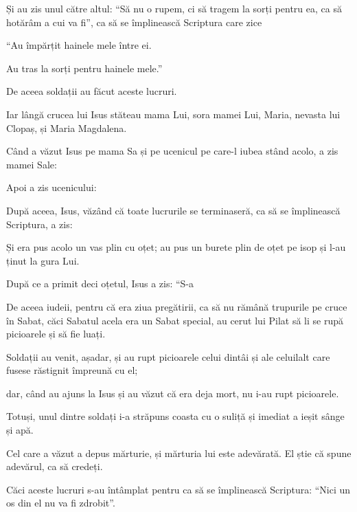 {Și au zis unul către altul: “Să nu o rupem, ci să tragem la sorți pentru ea, ca să hotărâm a cui va fi”, ca să se împlinească Scriptura care zice

\par }{\Q “Au împărțit hainele mele între ei.

\par }{\QB Au tras la sorți pentru hainele mele.”

\par }{\MM De aceea soldații au făcut aceste lucruri.


\par }{\PP {}Iar lângă crucea lui Isus stăteau mama Lui, sora mamei Lui, Maria, nevasta lui Clopaș, și Maria Magdalena.

Când a văzut Isus pe mama Sa și pe ucenicul pe care-l iubea stând acolo, a zis mamei Sale:
{}

Apoi a zis ucenicului:
{}


\par }{\PP {}După aceea, Isus, văzând că toate lucrurile se terminaseră, ca să se împlinească Scriptura, a zis:
{}

Și era pus acolo un vas plin cu oțet; au pus un burete plin de oțet pe isop și l-au ținut la gura Lui.

După ce a primit deci oțetul, Isus a zis: “S-a
{}


\par }{\PP {}De aceea iudeii, pentru că era ziua pregătirii, ca să nu rămână trupurile pe cruce în Sabat, căci Sabatul acela era un Sabat special, au cerut lui Pilat să li se rupă picioarele și să fie luați.

Soldații au venit, așadar, și au rupt picioarele celui dintâi și ale celuilalt care fusese răstignit împreună cu el;

dar, când au ajuns la Isus și au văzut că era deja mort, nu i-au rupt picioarele.

Totuși, unul dintre soldați i-a străpuns coasta cu o suliță și imediat a ieșit sânge și apă.

Cel care a văzut a depus mărturie, și mărturia lui este adevărată. El știe că spune adevărul, ca să credeți.

Căci aceste lucruri s-au întâmplat pentru ca să se împlinească Scriptura: “Nici un os din el nu va fi zdrobit”.

}
